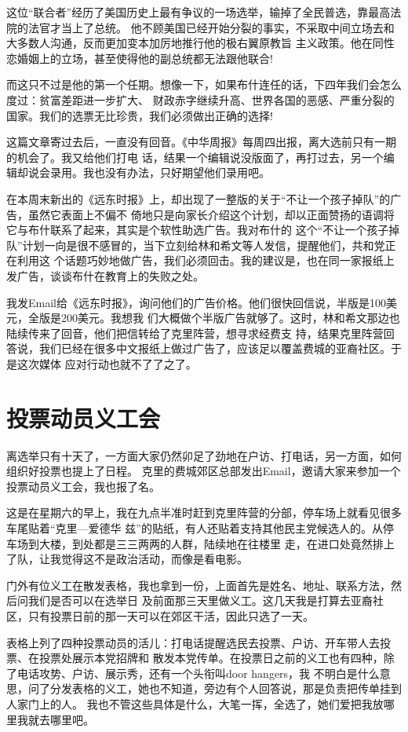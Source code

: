 ﻿\documentclass[11pt]{article}
\begin{document}
这位``联合者''经历了美国历史上最有争议的一场选举，输掉了全民普选，靠最高法院的法官才当上了总统。
他不顾美国已经开始分裂的事实，不采取中间立场去和大多数人沟通，反而更加变本加厉地推行他的极右翼原教旨
主义政策。他在同性恋婚姻上的立场，甚至使得他的副总统都无法跟他联合!

而这只不过是他的第一个任期。想像一下，如果布什连任的话，下四年我们会怎么度过：贫富差距进一步扩大、
财政赤字继续升高、世界各国的恶感、严重分裂的国家。我们的选票无比珍贵，我们必须做出正确的选择!

这篇文章寄过去后，一直没有回音。《中华周报》每周四出报，离大选前只有一期的机会了。我又给他们打电
话，结果一个编辑说没版面了，再打过去，另一个编辑却说会录用。我也没有办法，只好期望他们录用吧。

在本周末新出的《远东时报》上，却出现了一整版的关于``不让一个孩子掉队''的广告，虽然它表面上不偏不
倚地只是向家长介绍这个计划，却以正面赞扬的语调将它与布什联系了起来，其实是个软性助选广告。我对布什的
这个``不让一个孩子掉队''计划一向是很不感冒的，当下立刻给林和希文等人发信，提醒他们，共和党正在利用这
个话题巧妙地做广告，我们必须回击。我的建议是，也在同一家报纸上发广告，谈谈布什在教育上的失败之处。

我发Email给《远东时报》，询问他们的广告价格。他们很快回信说，半版是100美元，全版是200美元。我想我
们大概做个半版广告就够了。这时，林和希文那边也陆续传来了回音，他们把信转给了克里阵营，想寻求经费支
持，结果克里阵营回答说，我们已经在很多中文报纸上做过广告了，应该足以覆盖费城的亚裔社区。于是这次媒体
应对行动也就不了了之了。

\section{投票动员义工会}

离选举只有十天了，一方面大家仍然卯足了劲地在户访、打电话，另一方面，如何组织好投票也提上了日程。
克里的费城郊区总部发出Email，邀请大家来参加一个投票动员义工会，我也报了名。

这是在星期六的早上，我在九点半准时赶到克里阵营的分部，停车场上就看见很多车尾贴着``克里---爱德华
兹''的贴纸，有人还贴着支持其他民主党候选人的。从停车场到大楼，到处都是三三两两的人群，陆续地在往楼里
走，在进口处竟然排上了队，让我觉得这不是政治活动，而像是看电影。

门外有位义工在散发表格，我也拿到一份，上面首先是姓名、地址、联系方法，然后问我们是否可以在选举日
及前面那三天里做义工。这几天我是打算去亚裔社区，只有投票日前的那一天可以在郊区干活，因此只选了一天。

表格上列了四种投票动员的活儿：打电话提醒选民去投票、户访、开车带人去投票、在投票处展示本党招牌和
散发本党传单。在投票日之前的义工也有四种，除了电话攻势、户访、展示秀，还有一个头衔叫door hangers，我
不明白是什么意思，问了分发表格的义工，她也不知道，旁边有个人回答说，那是负责把传单挂到人家门上的人。
我也不管这些具体是什么，大笔一挥，全选了，她们爱把我放哪里我就去哪里吧。
\end{document}
